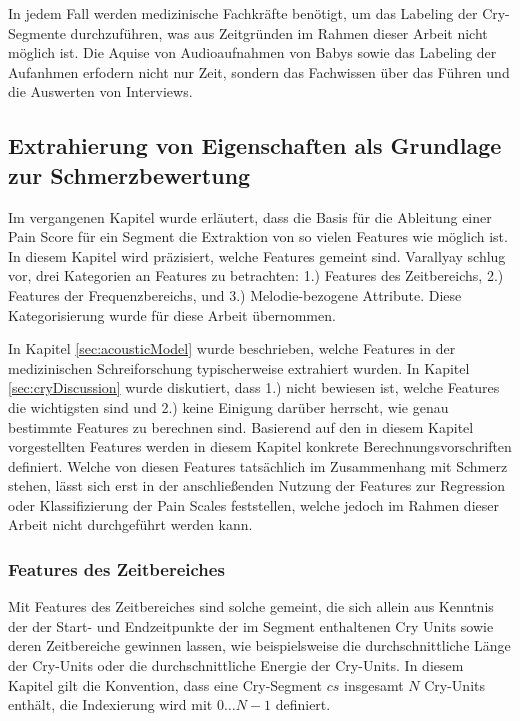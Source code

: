 In jedem Fall werden medizinische Fachkräfte benötigt, um das Labeling der Cry-Segmente durchzuführen, was aus Zeitgründen im Rahmen dieser Arbeit nicht möglich ist. Die Aquise von Audioaufnahmen von Babys sowie das Labeling der Aufanhmen erfodern nicht nur Zeit, sondern das Fachwissen über das Führen und die Auswerten von Interviews.

\subsection{Extrahierung von Eigenschaften als Grundlage zur Schmerzbewertung}
\label{sec:segmentFeatures}

Im vergangenen Kapitel wurde erläutert, dass die Basis für die Ableitung einer Pain Score für ein Segment die Extraktion von \glqq so vielen Features wie möglich\grqq{} ist. In diesem Kapitel wird präzisiert, welche Features gemeint sind.  Varallyay \cite[S. 16 - 17]{cry_thesis} schlug vor, drei Kategorien an Features zu betrachten: 1.) Features des Zeitbereichs, 2.) Features der Frequenzbereichs, und 3.) Melodie-bezogene Attribute. Diese Kategorisierung wurde für diese Arbeit übernommen.

In Kapitel \ref{sec:acousticModel} wurde beschrieben, welche Features in der medizinischen Schreiforschung typischerweise extrahiert wurden. In Kapitel \ref{sec:cryDiscussion} wurde diskutiert, dass 1.) nicht bewiesen ist, welche Features die \glqq wichtigsten\grqq{} sind und 2.) keine Einigung darüber herrscht, wie genau bestimmte Features zu berechnen sind. Basierend auf den in diesem Kapitel vorgestellten Features werden in diesem Kapitel konkrete Berechnungsvorschriften definiert. Welche von diesen Features tatsächlich im Zusammenhang mit Schmerz stehen, lässt sich erst in der anschließenden Nutzung der Features zur Regression oder Klassifizierung der Pain Scales feststellen, welche jedoch im Rahmen dieser Arbeit nicht durchgeführt werden kann.

\subsubsection{Features des Zeitbereiches}

Mit Features des Zeitbereiches sind solche gemeint, die sich allein aus Kenntnis der der Start- und Endzeitpunkte der im Segment enthaltenen Cry Units sowie deren Zeitbereiche gewinnen lassen, wie beispielsweise die durchschnittliche Länge der Cry-Units oder die durchschnittliche Energie der Cry-Units. In diesem Kapitel gilt die Konvention, dass eine Cry-Segment $cs$ insgesamt $N$ Cry-Units enthält, die Indexierung wird mit $0 \ldots N-1$ definiert.


